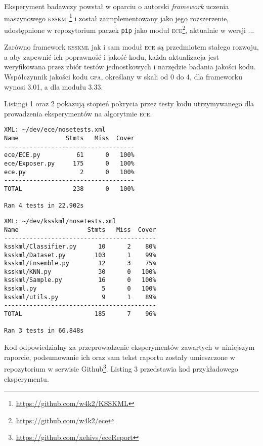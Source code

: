 Eksperyment badawczy powstał w oparciu o autorski \emph{framework} uczenia maszynowego \textsc{ksskml}\footnote{\url{https://github.com/w4k2/KSSKML}} i został zaimplementowany jako jego rozszerzenie, udostępnione w repozytorium paczek \verb|pip| jako moduł \textsc{ece}\footnote{\url{https://github.com/w4k2/ece}}, aktualnie w wersji ...

Zarówno framework \textsc{ksskml} jak i sam moduł \textsc{ece} są przedmiotem stałego rozwoju, a aby zapewnić ich poprawność i jakość kodu, każda aktualizacja jest weryfikowana przez zbiór testów jednostkowych i narzędzie badania jakości kodu. Współczynnik jakości kodu \textsc{gpa}, określany w skali od 0 do 4, dla frameworku wynosi 3.01, a dla modułu 3.33.

Listingi 1 oraz 2 pokazują stopień pokrycia przez testy kodu utrzymywanego dla prowadzenia eksperymentów na algorytmie \textsc{ece}.

\begin{lstlisting}[frame=single,caption=Pokrycie testów dla modułu \textsc{ece}]
XML: ~/dev/ece/nosetests.xml
Name             Stmts   Miss  Cover
------------------------------------
ece/ECE.py          61      0   100%
ece/Exposer.py     175      0   100%
ece.py               2      0   100%
------------------------------------
TOTAL              238      0   100%

Ran 4 tests in 22.902s
\end{lstlisting}

\begin{lstlisting}[frame=single,caption=Pokrycie testów dla frameworku \textsc{ksskml}]
XML: ~/dev/ksskml/nosetests.xml
Name                   Stmts   Miss  Cover
------------------------------------------
ksskml/Classifier.py      10      2    80%
ksskml/Dataset.py        103      1    99%
ksskml/Ensemble.py        12      3    75%
ksskml/KNN.py             30      0   100%
ksskml/Sample.py          16      0   100%
ksskml.py                  5      0   100%
ksskml/utils.py            9      1    89%
------------------------------------------
TOTAL                    185      7    96%

Ran 3 tests in 66.848s
\end{lstlisting}

Kod odpowiedzialny za przeprowadzenie eksperymentów zawartych w niniejszym raporcie, podsumowanie ich oraz sam tekst raportu zostały umieszczone w repozytorium w serwisie Github\footnote{\url{https://github.com/xehivs/eceReport}}. Listing 3 przedstawia kod przykładowego eksperymentu.

